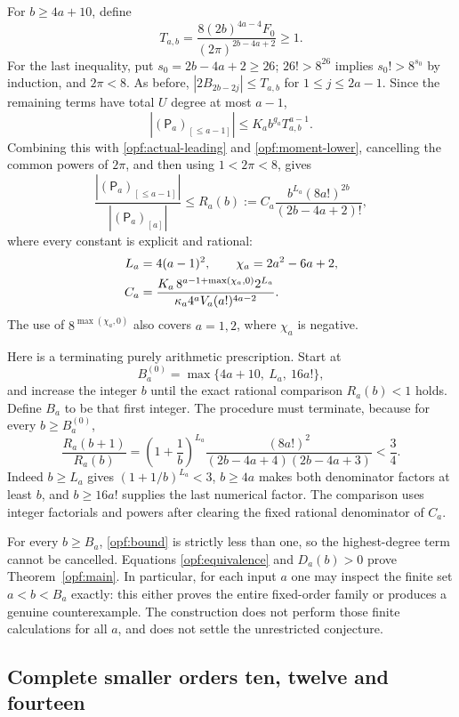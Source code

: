 For $b\ge4a+10$, define
\[
 T_{a,b}=\frac{8(2b)^{4a-4}F_0}{(2\pi)^{2b-4a+2}}\ge1.
\]
For the last inequality, put $s_0=2b-4a+2\ge26$;
$26!>8^{26}$ implies $s_0!>8^{s_0}$ by induction,
and $2\pi<8$.
As before, $|2B_{2b-2j}|\le T_{a,b}$ for $1\le j\le2a-1$.
Since the remaining terms have total $U$ degree at most $a-1$,
\[
 |(\mathsf P_a)_{[\le a-1]}|
      \le K_a b^{g_a}T_{a,b}^{a-1}.
\]
Combining this with \eqref{opf:actual-leading} and
\eqref{opf:moment-lower}, cancelling the common powers of $2\pi$,
and then using $1<2\pi<8$, gives
\begin{equation}\label{opf:bound}
 \frac{|(\mathsf P_a)_{[\le a-1]}|}{|(\mathsf P_a)_{[a]}|}
 \le R_a(b):=C_a\frac{b^{L_a}(8a!)^{2b}}{(2b-4a+2)!},
\end{equation}
where every constant is explicit and rational:
\begin{align}
 L_a&=4(a-1)^2,\qquad \chi_a=2a^2-6a+2,\notag\\
 C_a&=\frac{K_a\,8^{a-1+\max(\chi_a,0)}2^{L_a}}
 {\kappa_a4^aV_a(a!)^{4a-2}}.
 \label{opf:constant}
\end{align}
The use of $8^{\max(\chi_a,0)}$ also covers $a=1,2$, where
$\chi_a$ is negative.

Here is a terminating purely arithmetic prescription. Start at
\[
 B_a^{(0)}=\max\{4a+10,\ L_a,\ 16a!\},
\]
and increase the integer $b$ until the exact rational comparison
$R_a(b)<1$ holds. Define $B_a$ to be that first integer. The procedure
must terminate, because for every $b\ge B_a^{(0)}$,
\[
 \frac{R_a(b+1)}{R_a(b)}
 =\left(1+\frac1b\right)^{L_a}
 \frac{(8a!)^2}{(2b-4a+4)(2b-4a+3)}<\frac34.
\]
Indeed $b\ge L_a$ gives $(1+1/b)^{L_a}<3$,
$b\ge4a$ makes both denominator factors at least $b$, and
$b\ge16a!$ supplies the last numerical factor.
The comparison uses integer factorials and powers after clearing
the fixed rational denominator of $C_a$.

For every $b\ge B_a$, \eqref{opf:bound} is strictly less than one,
so the highest-degree term cannot be cancelled. Equations
\eqref{opf:equivalence} and $D_a(b)>0$ prove
Theorem~\ref{opf:main}. In particular, for each input $a$ one may
inspect the finite set $a<b<B_a$ exactly: this either proves the
entire fixed-order family or produces a genuine counterexample.
The construction does not perform those finite calculations for all
$a$, and does not settle the unrestricted conjecture.


\subsection{Complete smaller orders ten, twelve and fourteen}

